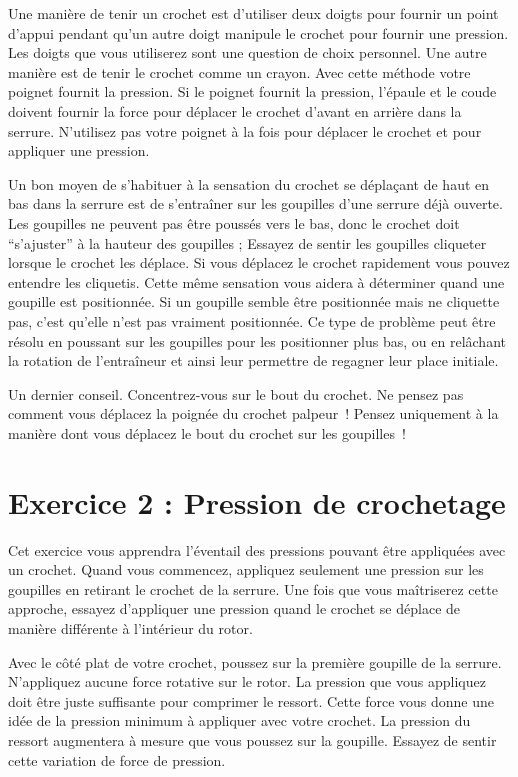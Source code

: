\documentclass[a4paper,french,11pt,twoside]{report}
\begin{document}
Une manière de tenir un crochet est d'utiliser deux doigts pour fournir un point d'appui pendant qu'un autre doigt manipule le crochet pour fournir une pression. Les doigts que vous utiliserez sont une question de choix personnel. Une autre manière est de tenir le crochet comme un crayon. Avec cette méthode votre poignet fournit la pression. Si le poignet fournit la pression, l'épaule et le coude doivent fournir la force pour déplacer le crochet d'avant en arrière dans la serrure. N'utilisez pas votre poignet à la fois pour déplacer le crochet et pour appliquer une pression.

Un bon moyen de s'habituer à la sensation du crochet se déplaçant de haut en bas dans la serrure est de s'entraîner sur les goupilles d'une serrure déjà ouverte. Les goupilles ne peuvent pas être poussés vers le bas, donc le crochet doit \enquote{s'ajuster} à la hauteur des goupilles ; Essayez de sentir les goupilles cliqueter lorsque le crochet les déplace. Si vous déplacez le crochet rapidement vous pouvez entendre les cliquetis. Cette même sensation vous aidera à déterminer quand une goupille est positionnée. Si un goupille semble être positionnée mais ne cliquette pas, c'est qu'elle n'est pas vraiment positionnée. Ce type de problème peut être résolu en poussant sur les goupilles pour les positionner plus bas, ou en relâchant la rotation de l'entraîneur et ainsi leur permettre de regagner leur place initiale.

Un dernier conseil. Concentrez-vous sur le bout du crochet. Ne pensez pas comment vous déplacez la poignée du crochet palpeur~! Pensez uniquement à la manière dont vous déplacez le bout du crochet sur les goupilles~!

\section{Exercice 2 : Pression de crochetage}

Cet exercice vous apprendra l'éventail des pressions pouvant être appliquées avec un crochet. Quand vous commencez, appliquez seulement une pression sur les goupilles en retirant le crochet de la serrure. Une fois que vous maîtriserez cette approche, essayez d'appliquer une pression quand le crochet se déplace de manière différente à l'intérieur du rotor.

Avec le côté plat de votre crochet, poussez sur la première goupille de la serrure. N'appliquez aucune force rotative sur le rotor. La pression que vous appliquez doit être juste suffisante pour comprimer le ressort. Cette force vous donne une idée de la pression minimum à appliquer avec votre crochet. La pression du ressort augmentera à mesure que vous poussez sur la goupille. Essayez de sentir cette variation de force de pression.
\end{document}
